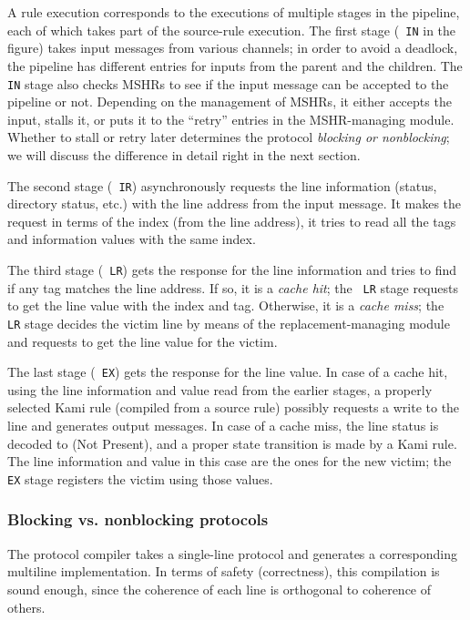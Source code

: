 A \hemiola{} rule execution corresponds to the executions of multiple stages in the pipeline, each of which takes part of the source-rule execution.
The first stage ({\small\tt\color{myblue} IN} in the figure) takes input messages from various channels; in order to avoid a deadlock, the pipeline has different entries for inputs from the parent and the children.
The {\small\tt\color{myblue} IN} stage also checks MSHRs to see if the input message can be accepted to the pipeline or not.
Depending on the management of MSHRs, it either accepts the input, stalls it, or puts it to the ``retry'' entries in the MSHR-managing module.
Whether to stall or retry later determines the protocol \emph{blocking or nonblocking}; we will discuss the difference in detail right in the next section.

The second stage ({\small\tt\color{myblue} IR}) asynchronously requests the line information (status, directory status, etc.) with the line address from the input message.
It makes the request in terms of the index (from the line address), \ie{} it tries to read all the tags and information values with the same index.

The third stage ({\small\tt\color{myblue} LR}) gets the response for the line information and tries to find if any tag matches the line address.
If so, it is a \emph{cache hit}; the {\small\tt\color{myblue} LR} stage requests to get the line value with the index and tag.
Otherwise, it is a \emph{cache miss}; the {\small\tt\color{myblue} LR} stage decides the victim line by means of the replacement-managing module and requests to get the line value for the victim.

The last stage ({\small\tt\color{myblue} EX}) gets the response for the line value.
In case of a cache hit, using the line information and value read from the earlier stages, a properly selected Kami rule (compiled from a source \hemiola{} rule) possibly requests a write to the line and generates output messages.
In case of a cache miss, the line status is decoded to \stNP{} (Not Present), and a proper state transition is made by a Kami rule.
The line information and value in this case are the ones for the new victim; the {\small\tt\color{myblue} EX} stage registers the victim using those values.

\subsubsection{Blocking vs. nonblocking protocols}

The protocol compiler takes a single-line \hemiola{} protocol and generates a corresponding multiline implementation.
In terms of safety (correctness), this compilation is sound enough, since the coherence of each line is orthogonal to coherence of others.

